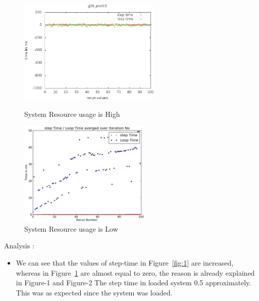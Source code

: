 \documentclass[a4paper,11pt]{article}
\begin{document}
	\begin{figure}[ht]
	\begin{minipage}[ht]{0.5\linewidth}
	\includegraphics[height=50mm]{plots/g28_project_plot03.eps}
	\caption{System Resource usage is High }		
	\label{fig:1}
	\end{minipage}	
	\begin{minipage}[ht]{0.5\linewidth}
	\includegraphics[height=50mm]{plots1/g28_project_plot03.eps}
	\caption{System Resource usage is Low }		
	\label{fig:2}
	\end{minipage}	
	\end{figure}
	Analysis :
	\begin{itemize}
	\item  We can see that the values of step-time in Figure~\ref{fig:1} are increased, whereas in     
	Figure~\ref{fig:2} are almost equal to zero, the reason is already explained in Figure-1 and Figure-2
	The step time in loaded system 0.5 approximately. This was as expected since the system was loaded.
	\end{itemize}
\end{document}
